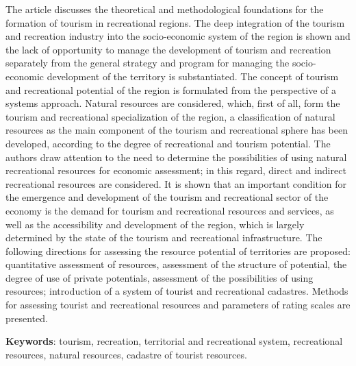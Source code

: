 The article discusses the theoretical and methodological foundations for
the formation of tourism in recreational regions. The deep integration
of the tourism and recreation industry into the socio-economic system of
the region is shown and the lack of opportunity to manage the
development of tourism and recreation separately from the general
strategy and program for managing the socio-economic development of the
territory is substantiated. The concept of tourism and recreational
potential of the region is formulated from the perspective of a systems
approach. Natural resources are considered, which, first of all, form
the tourism and recreational specialization of the region, a
classification of natural resources as the main component of the tourism
and recreational sphere has been developed, according to the degree of
recreational and tourism potential. The authors draw attention to the
need to determine the possibilities of using natural recreational
resources for economic assessment; in this regard, direct and indirect
recreational resources are considered. It is shown that an important
condition for the emergence and development of the tourism and
recreational sector of the economy is the demand for tourism and
recreational resources and services, as well as the accessibility and
development of the region, which is largely determined by the state of
the tourism and recreational infrastructure. The following directions
for assessing the resource potential of territories are proposed:
quantitative assessment of resources, assessment of the structure of
potential, the degree of use of private potentials, assessment of the
possibilities of using resources; introduction of a system of tourist
and recreational cadastres. Methods for assessing tourist and
recreational resources and parameters of rating scales are presented.

{\bfseries Keywords}: tourism, recreation, territorial and recreational
system, recreational resources, natural resources, cadastre of tourist
resources.

